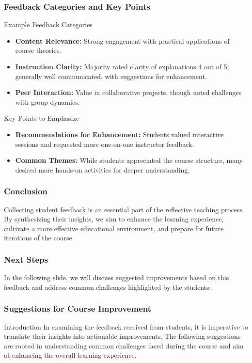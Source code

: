\documentclass[aspectratio=169]{beamer}
\begin{document}
\begin{frame}[fragile]
    \frametitle{Feedback Categories and Key Points}
    \begin{block}{Example Feedback Categories}
        \begin{itemize}
            \item \textbf{Content Relevance:} Strong engagement with practical applications of course theories.
            \item \textbf{Instruction Clarity:} Majority rated clarity of explanations 4 out of 5; generally well communicated, with suggestions for enhancement.
            \item \textbf{Peer Interaction:} Value in collaborative projects, though noted challenges with group dynamics.
        \end{itemize}
    \end{block}

    \begin{block}{Key Points to Emphasize}
        \begin{itemize}
            \item \textbf{Recommendations for Enhancement:} Students valued interactive sessions and requested more one-on-one instructor feedback.
            \item \textbf{Common Themes:} While students appreciated the course structure, many desired more hands-on activities for deeper understanding.
        \end{itemize}
    \end{block}
\end{frame}

\begin{frame}[fragile]
    \frametitle{Conclusion}
    Collecting student feedback is an essential part of the reflective teaching process. By synthesizing their insights, we aim to enhance the learning experience, cultivate a more effective educational environment, and prepare for future iterations of the course.
\end{frame}

\begin{frame}[fragile]
    \frametitle{Next Steps}
    In the following slide, we will discuss suggested improvements based on this feedback and address common challenges highlighted by the students.
\end{frame}

\begin{frame}[fragile]
    \frametitle{Suggestions for Course Improvement}
    
    \begin{block}{Introduction}
        In examining the feedback received from students, it is imperative to translate their insights into actionable improvements. The following suggestions are rooted in understanding common challenges faced during the course and aim at enhancing the overall learning experience.
    \end{block}
\end{frame}
\end{document}
